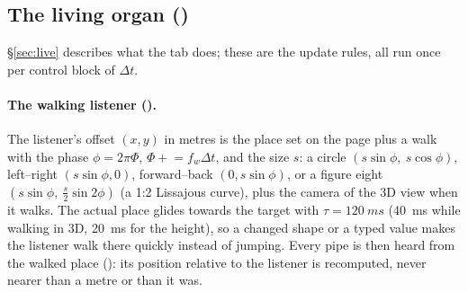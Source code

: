 \subsection{The living organ ()}
\label{sec:math-live}
\S\ref{sec:live} describes what the tab does; these are the update rules, all run once per control block of $\Delta t$.

\paragraph{The walking listener ().} The listener's offset $(x,y)$ in metres is the place set on the
page plus a walk with the phase $\phi = 2\pi\Phi$, $\Phi \mathrel{+}= f_w\Delta t$, and the size $s$: a circle
$(s\sin\phi,\ s\cos\phi)$, left--right $(s\sin\phi, 0)$, forward--back $(0, s\sin\phi)$, or a figure eight
$(s\sin\phi,\ \tfrac s2\sin2\phi)$ (a 1:2 Lissajous curve), plus the camera of the 3D view when it walks. The actual place
glides towards the target with $\tau = \SI{120}{ms}$ (\SI{40}{ms} while walking in 3D, \SI{20}{ms} for the height), so a
changed shape or a typed value makes the listener walk there quickly instead of jumping. Every pipe is then heard from
the walked place (): its position relative to the listener is recomputed, never nearer than a metre or than
it was.


